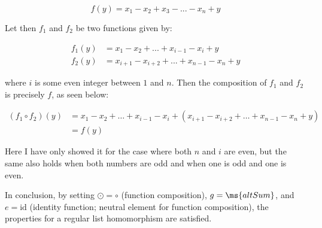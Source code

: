 $$
f(y) = x_1 - x_2 + x_3 - ... - x_n + y
$$

Let then $f_1$ and $f_2$ be two functions given by:

\begin{align*}
  f_1(y) &= x_1 - x_2 + ... + x_{i - 1} - x_i + y\\[4pt]
  f_2(y) &= x_{i + 1} - x_{i + 2} + ... + x_{n-1} - x_n + y
\end{align*}

where $i$ is some even integer between $1$ and $n$. Then the composition of $f_1$
and $f_2$ is precisely $f$, as seen below:

\begin{align*}
  (f_1 \circ f_2)(y) &= x_1 - x_2 + \dots + x_{i - 1} - x_i + (x_{i + 1} - x_{i + 2}
  + \dots + x_{n-1} - x_n + y)\\[4pt]
                   &= f(y)
\end{align*}

Here I have only showed it for the case where both $n$ and $i$ are even, but the
same also holds when both numbers are odd and when one is odd and one is even.

\medskip

In conclusion, by setting $\odot = \circ$ (function composition), $g =
\ms{altSum}$, and $e = \text{id}$ (identity function; neutral element for
function composition), the properties for a regular list homomorphism are
satisfied.

\Sectend

